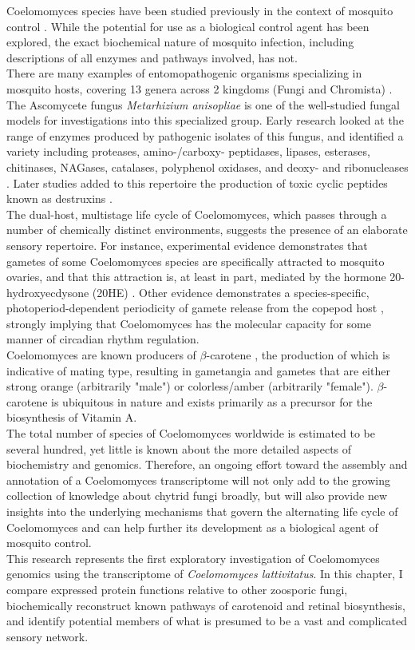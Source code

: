 \indent Coelomomyces species have been studied previously in the context of mosquito control \cite{Scholte2004}. While the potential for use as a biological control agent has been explored, the exact biochemical nature of mosquito infection, including descriptions of all enzymes and pathways involved, has not. \\
\indent There are many examples of entomopathogenic organisms specializing in mosquito hosts, covering 13 genera across 2 kingdoms (Fungi and Chromista) \cite{Scholte2004}. The Ascomycete fungus \textit{Metarhizium anisopliae} is one of the well-studied fungal models for investigations into this specialized group. Early research looked at the range of enzymes produced by pathogenic isolates of this fungus, and identified a variety including proteases, amino-/carboxy- peptidases, lipases, esterases, chitinases, NAGases, catalases, polyphenol oxidases, and deoxy- and ribonucleases \cite{StLeger1986}. Later studies added to this repertoire the production of toxic cyclic peptides known as destruxins \cite{Wang2012}. \\ 
\indent The dual-host, multistage life cycle of Coelomomyces, which passes through a number of chemically distinct environments, suggests the presence of an elaborate sensory repertoire. For instance, experimental evidence demonstrates that gametes of some Coelomomyces species are specifically attracted to mosquito ovaries, and that this attraction is, at least in part, mediated by the hormone 20-hydroxyecdysone (20HE) \cite{Lucarotti1992}. Other evidence demonstrates a species-specific, photoperiod-dependent periodicity of gamete release from the copepod host \cite{Federici1983}, strongly implying that Coelomomyces has the molecular capacity for some manner of circadian rhythm regulation. \\
\indent Coelomomyces are known producers of $\beta$-carotene \cite{Federici1979}, the production of which is indicative of mating type, resulting in gametangia and gametes that are either strong orange (arbitrarily "male") or colorless/amber (arbitrarily "female"). $\beta$-carotene is ubiquitous in nature and exists primarily as a precursor for the biosynthesis of Vitamin A.\\
\indent The total number of species of Coelomomyces worldwide is estimated to be several hundred, yet little is known about the more detailed aspects of biochemistry and genomics. Therefore, an ongoing effort toward the assembly and annotation of a Coelomomyces transcriptome will not only add to the growing collection of knowledge about chytrid fungi broadly, but will also provide new insights into the underlying mechanisms that govern the alternating life cycle of Coelomomyces and can help further its development as a biological agent of mosquito control. \\
\indent This research represents the first exploratory investigation of Coelomomyces genomics using the transcriptome of \textit{Coelomomyces lattivitatus}. In this chapter, I compare expressed protein functions relative to other zoosporic fungi, biochemically reconstruct known pathways of carotenoid and retinal biosynthesis, and identify potential members of what is presumed to be a vast and complicated sensory network. \\

